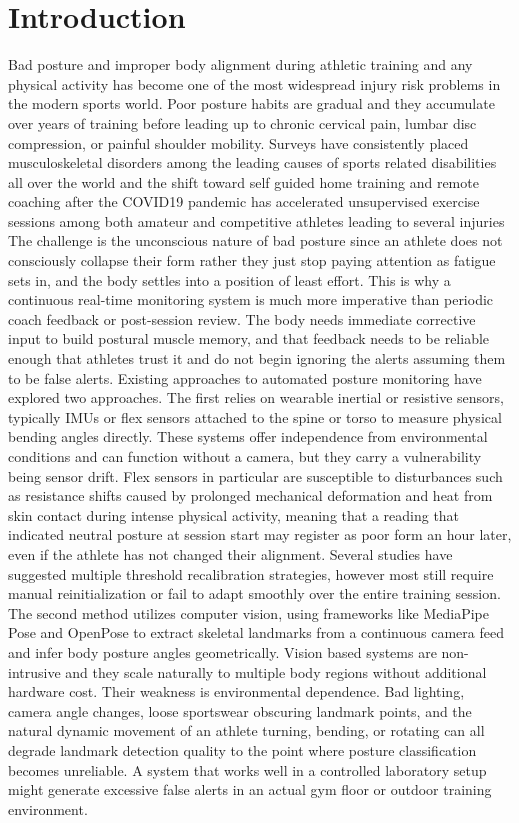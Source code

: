 \documentclass[conference]{IEEEtran}
\begin{document}
\section{Introduction}
Bad posture and improper body alignment during athletic training and any physical activity has become one of the most widespread injury risk problems in the modern sports world. Poor posture habits are gradual and they accumulate over years of training before leading up to chronic cervical pain, lumbar disc compression, or painful shoulder mobility. Surveys have consistently placed musculoskeletal disorders among the leading causes of sports related disabilities all over the world and the shift toward self guided home training and remote coaching after the COVID19 pandemic has accelerated unsupervised exercise sessions among both amateur and competitive athletes leading to several injuries
The challenge is the unconscious nature of bad posture since an athlete does not consciously collapse their form rather they just stop paying attention as fatigue sets in, and the body settles into a position of least effort. This is why a continuous real-time monitoring system is much more imperative than periodic coach feedback or post-session review. The body needs immediate corrective input to build postural muscle memory, and that feedback needs to be reliable enough that athletes trust it and do not begin ignoring the alerts assuming them to be false alerts.
Existing approaches to automated posture monitoring have explored two approaches. The first relies on wearable inertial or resistive sensors, typically IMUs or flex sensors attached to the spine or torso to measure physical bending angles directly. These systems offer independence from environmental conditions and can function without a camera, but they carry a vulnerability being sensor drift. Flex sensors in particular are susceptible to disturbances such as resistance shifts caused by prolonged mechanical deformation and heat from skin contact during intense physical activity, meaning that a reading that indicated neutral posture at session start may register as poor form an hour later, even if the athlete has not changed their alignment. Several studies have suggested multiple threshold recalibration strategies, however most still require manual reinitialization or fail to adapt smoothly over the entire training session.
The second method utilizes computer vision, using frameworks like MediaPipe Pose and OpenPose to extract skeletal landmarks from a continuous camera feed and infer body posture angles geometrically. Vision based systems are non-intrusive and they scale naturally to multiple body regions without additional hardware cost. Their weakness is environmental dependence. Bad lighting, camera angle changes, loose sportswear obscuring landmark points, and the natural dynamic movement of an athlete turning, bending, or rotating can all degrade landmark detection quality to the point where posture classification becomes unreliable. A system that works well in a controlled laboratory setup might generate excessive false alerts in an actual gym floor or outdoor training environment.
\end{document}
